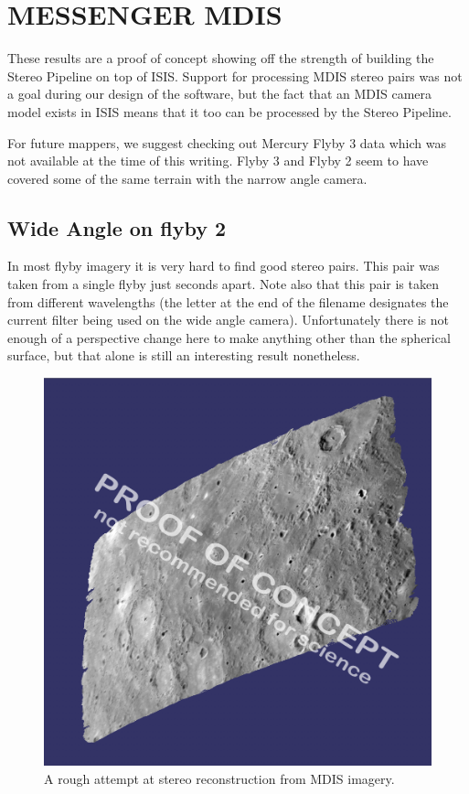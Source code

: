 \section{MESSENGER MDIS}

These results are a proof of concept showing off the strength of
building the Stereo Pipeline on top of \ac{ISIS}. Support for processing
MDIS stereo pairs was not a goal during our design of the software,
but the fact that an MDIS camera model exists in ISIS means that
it too can be processed by the Stereo Pipeline.

For future mappers, we suggest checking out Mercury Flyby 3 data which
was not available at the time of this writing. Flyby 3 and Flyby 2
seem to have covered some of the same terrain with the narrow angle
camera.

\subsection{Wide Angle on flyby 2}

In most flyby imagery it is very hard to find good stereo pairs.
This pair was taken from a single flyby just seconds apart. Note
also that this pair is taken from different wavelengths (the letter
at the end of the filename designates the current filter being used
on the wide angle camera). Unfortunately there is not enough of a
perspective change here to make anything other than the spherical
surface, but that alone is still an interesting result nonetheless.

\begin{figure}[h!]
  \begin{center}
  \includegraphics[width=5in]{images/examples/mdis/mdis_wide_example.png}
  \end{center}
  \caption{ A rough attempt at stereo reconstruction from MDIS imagery. }
  \label{fig:mdis_attempt}
\end{figure}

